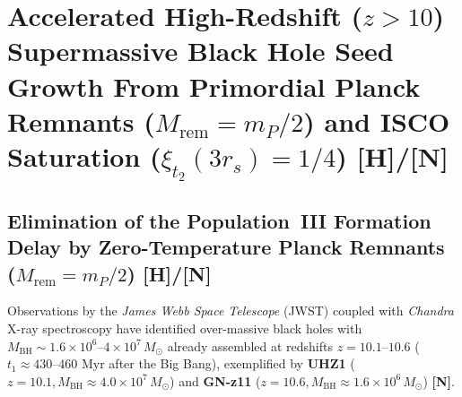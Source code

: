 \documentclass[11pt,a4paper]{article}
\newcommand{\catH}{\textbf{\textcolor{orange!85!black}{[H]}}}
\newcommand{\catN}{\textbf{\textcolor{teal!75!black}{[N]}}}
\theoremstyle{plain}
\theoremstyle{definition}
\theoremstyle{remark}
\numberwithin{equation}{section}
\begin{document}
\section{\texorpdfstring{Accelerated High-Redshift ($z > 10$) Supermassive Black Hole Seed Growth From Primordial Planck Remnants ($M_{\text{rem}} = m_P/2$) and ISCO Saturation ($\xi_{t_2}(3r_s) = 1/4$) \catH/\catN}{Accelerated High-Redshift (z > 10) Supermassive Black Hole Seed Growth From Primordial Planck Remnants and ISCO Saturation}}

\subsection{\texorpdfstring{Elimination of the Population~III Formation Delay by Zero-Temperature Planck Remnants ($M_{\text{rem}} = m_P/2$) \catH/\catN}{Elimination of the Population III Formation Delay by Zero-Temperature Planck Remnants}}

Observations by the \textit{James Webb Space Telescope} (JWST) coupled with \textit{Chandra} X-ray spectroscopy have identified over-massive black holes with $M_{\text{BH}} \sim 1.6 \times 10^6\text{--}4 \times 10^7\,M_\odot$ already assembled at redshifts $z = 10.1\text{--}10.6$ ($t_1 \approx 430\text{--}460\text{ Myr}$ after the Big Bang), exemplified by \textbf{UHZ1} ($z = 10.1, M_{\text{BH}} \approx 4.0 \times 10^7\,M_\odot$) \cite{bogdan2024} and \textbf{GN-z11} ($z = 10.6, M_{\text{BH}} \approx 1.6 \times 10^6\,M_\odot$) \cite{maiolino2024} \catN.
\end{document}

